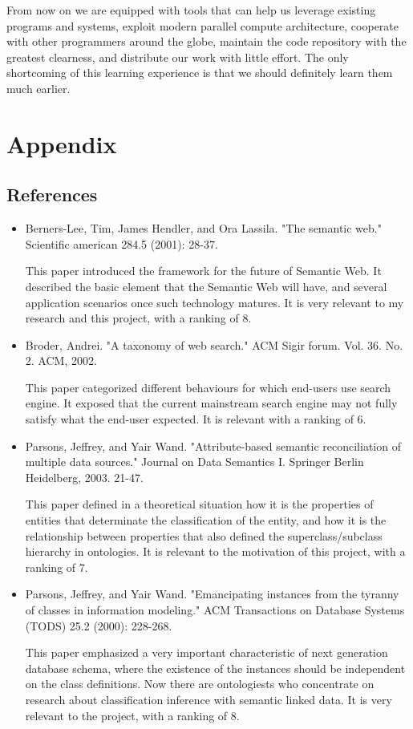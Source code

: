 \documentclass[12pt]{cls}
\begin{document}
From now on we are equipped with tools that can help us leverage existing programs and systems, exploit modern parallel compute architecture, cooperate with other programmers around the globe, maintain the code repository with the greatest clearness, and distribute our work with little effort. The only shortcoming of this learning experience is that we should definitely learn them much earlier.

\chapter{Appendix}
\section{References}

\begin{itemize}
\item Berners-Lee, Tim, James Hendler, and Ora Lassila. "The semantic web." Scientific american 284.5 (2001): 28-37.

This paper introduced the framework for the future of Semantic Web. It described the basic element that the Semantic Web will have, and several application scenarios once such technology matures. It is very relevant to my research and this project, with a ranking of 8.

\item Broder, Andrei. "A taxonomy of web search." ACM Sigir forum. Vol. 36. No. 2. ACM, 2002.

This paper categorized different behaviours for which end-users use search engine. It exposed that the current mainstream search engine may not fully satisfy what the end-user expected. It is relevant with a ranking of 6.

\item Parsons, Jeffrey, and Yair Wand. "Attribute-based semantic reconciliation of multiple data sources." Journal on Data Semantics I. Springer Berlin Heidelberg, 2003. 21-47.

This paper defined in a theoretical situation how it is the properties of entities that determinate the classification of the entity, and how it is the relationship between properties that also defined the superclass/subclass hierarchy in ontologies. It is relevant to the motivation of this project, with a ranking of 7. 

\item Parsons, Jeffrey, and Yair Wand. "Emancipating instances from the tyranny of classes in information modeling." ACM Transactions on Database Systems (TODS) 25.2 (2000): 228-268.

This paper emphasized a very important characteristic of next generation database schema, where the existence of the instances should be independent on the class definitions. Now there are ontologiests who concentrate on research about classification inference with semantic linked data. It is very relevant to the project, with a ranking of 8.
\end{itemize}
\end{document}
